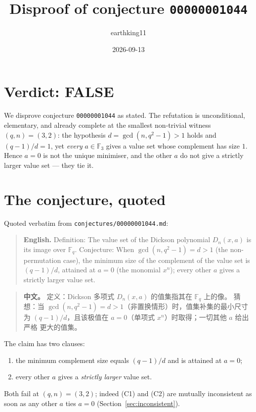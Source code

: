 \documentclass[11pt]{article}
\title{Disproof of conjecture \texttt{00000001044}}
\author{earthking11}
\date{2026-09-13}
\theoremstyle{definition}
\theoremstyle{remark}
\newcommand{\F}{\mathbb{F}}
\begin{document}
\maketitle

\section*{Verdict: FALSE}

We disprove conjecture \texttt{00000001044} as stated. The refutation is
unconditional, elementary, and already complete at the smallest non-trivial
witness $(q,n) = (3,2)$: the hypothesis $d = \gcd(n, q^2-1) > 1$ holds and
$(q-1)/d = 1$, yet \emph{every} $a \in \F_3$ gives a value set whose complement
has size $1$. Hence $a = 0$ is not the unique minimiser, and the other $a$ do
not give a strictly larger value set --- they tie it.

\section{The conjecture, quoted}

Quoted verbatim from \texttt{conjectures/00000001044.md}:

\begin{quote}
\textbf{English.} Definition: The value set of the Dickson polynomial
$D_n(x,a)$ is its image over $\F_q$. Conjecture: When
$\gcd(n, q^2-1) = d > 1$ (the non-permutation case), the minimum size of the
complement of the value set is $(q-1)/d$, attained at $a = 0$ (the monomial
$x^n$); every other $a$ gives a strictly larger value set.
\end{quote}

\begin{quote}
\textbf{中文。} 定义：Dickson 多项式 $D_n(x,a)$ 的值集指其在 $\F_q$ 上的像。
猜想：当 $\gcd(n,q^2-1)=d>1$（非置换情形）时，值集补集的最小尺寸为
$(q-1)/d$，且该极值在 $a=0$（单项式 $x^n$）时取得；一切其他 $a$ 给出严格
更大的值集。
\end{quote}

The claim has two clauses:
\begin{enumerate}
\item[(C1)] the minimum complement size equals $(q-1)/d$ and is attained at
  $a=0$;
\item[(C2)] every other $a$ gives a \emph{strictly larger} value set.
\end{enumerate}
Both fail at $(q,n) = (3,2)$; indeed (C1) and (C2) are mutually inconsistent
as soon as any other $a$ ties $a=0$ (Section~\ref{sec:inconsistent}).
\end{document}
